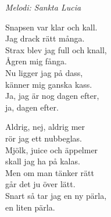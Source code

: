 {\footnotesize\textit{Melodi: Sankta Lucia}}\par
\vspace{10pt}
Snapsen var klar och kall.\\
Jag drack rätt många.\\
Strax blev jag full och knall,\\
Ågren mig fånga.\\
Nu ligger jag på dass,\\
känner mig ganska kass.\\
Ja, jag är nog dagen efter,\\
ja, dagen efter.\par
\vspace{10pt}
Aldrig, nej, aldrig mer\\
rör jag ett nubbeglas.\\
Mjölk, juice och äppelmer\\
skall jag ha på kalas.\\
Men om man tänker rätt\\
går det ju över lätt.\\
Snart så tar jag en ny pärla,\\
en liten pärla.
